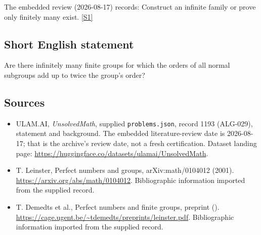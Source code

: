 \documentclass[11pt,a4paper]{article}
\newcommand{\sref}[2]{\hyperlink{source:#1:#2}{[S#2]}}
\begin{document}
The embedded review (2026-08-17) records: Construct an infinite family or prove only finitely many exist. \sref{1193}{1}

\subsection{Short English statement}

Are there infinitely many finite groups for which the orders of all normal subgroups add up to twice the group’s order?

\subsection{Sources}

{\small

\begin{itemize}

\item[\hypertarget{source:1193:1}{S1}] ULAM.AI, \emph{UnsolvedMath}, supplied \texttt{problems.json}, record 1193 (ALG-029), statement and background. The embedded literature-review date is 2026-08-17; that is the archive’s review date, not a fresh certification. Dataset landing page: \url{https://huggingface.co/datasets/ulamai/UnsolvedMath}.

\item[\hypertarget{source:1193:2}{S2}] T. Leinster, Perfect numbers and groups, arXiv:math/0104012 (2001). \url{https://arxiv.org/abs/math/0104012}. Bibliographic information imported from the supplied record.

\item[\hypertarget{source:1193:3}{S3}] T. Demedts et al., Perfect numbers and finite groups, preprint (). \url{https://cage.ugent.be/~tdemedts/preprints/leinster.pdf}. Bibliographic information imported from the supplied record.

\end{itemize}

}

\label{end:1193}
\end{document}
